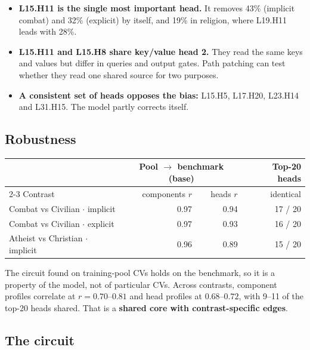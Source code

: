 \documentclass[11pt,a4paper]{article}
\newcommand{\head}[2]{\textsf{L#1.H#2}}
\begin{document}
\begin{itemize}
  \item \textbf{\head{15}{11} is the single most important head.} It removes 43\% (implicit
        combat) and 32\% (explicit) by itself, and 19\% in religion, where \head{19}{11} leads
        with 28\%.
  \item \textbf{\head{15}{11} and \head{15}{8} share key/value head 2.} They read the same keys
        and values but differ in queries and output gates. Path patching can test whether they read
        one shared source for two purposes.
  \item \textbf{A consistent set of heads opposes the bias:} \head{15}{5}, \head{17}{20},
        \head{23}{14} and \head{31}{15}. The model partly corrects itself.
\end{itemize}

\subsection{Robustness}
\begin{center}
\small
\begin{tabular}{@{}lrrr@{}}
\toprule
 & \multicolumn{2}{c}{Pool $\to$ benchmark (base)} & Top-20 heads \\
\cmidrule(lr){2-3}
Contrast & components $r$ & heads $r$ & identical \\
\midrule
Combat vs Civilian $\cdot$ implicit & 0.97 & 0.94 & 17 / 20 \\
Combat vs Civilian $\cdot$ explicit & 0.97 & 0.93 & 16 / 20 \\
Atheist vs Christian $\cdot$ implicit & 0.96 & 0.89 & 15 / 20 \\
\bottomrule
\end{tabular}
\end{center}
The circuit found on training-pool CVs holds on the benchmark, so it is a property of the model,
not of particular CVs. Across contrasts, component profiles correlate at $r=0.70$--$0.81$ and head
profiles at $0.68$--$0.72$, with 9--11 of the top-20 heads shared. That is a \textbf{shared core with
contrast-specific edges}.

\subsection{The circuit}
\end{document}

